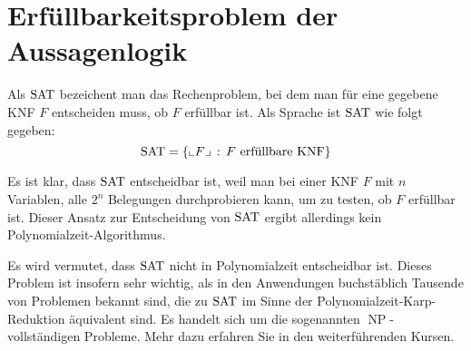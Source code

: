\section{Erfüllbarkeitsproblem der Aussagenlogik}

\begin{defn}
	Als $\operatorname{SAT}$ bezeichent man das Rechenproblem, bei dem man für eine gegebene KNF $F$ entscheiden muss, ob $F$ erfüllbar ist. Als Sprache ist $\operatorname{SAT}$ wie folgt gegeben: 
	\[
		\operatorname{SAT} = \left\{ {\llcorner F\lrcorner} \,:\, F \ \text{erfüllbare KNF} \right\}
	\]
\end{defn} 

\begin{bem}
	Es ist klar, dass $\operatorname{SAT}$ entscheidbar ist, weil man bei einer KNF $F$ mit $n$ Variablen, alle $2^n$ Belegungen durchprobieren kann, um zu testen, ob $F$ erfüllbar ist. Dieser Ansatz zur Entscheidung von $\operatorname{SAT}$ ergibt allerdings kein Polynomialzeit-Algorithmus. 
\end{bem} 

\begin{bem} 
	Es wird vermutet, dass $\operatorname{SAT}$  nicht in Polynomialzeit entscheidbar ist. Dieses Problem ist insofern sehr wichtig, als in den Anwendungen buchstäblich Tausende von Problemen bekannt sind, die zu $\operatorname{SAT}$ im Sinne der Polynomialzeit-Karp-Reduktion äquivalent sind. Es handelt sich um die sogenannten $\operatorname{NP}$-vollständigen Probleme. Mehr dazu erfahren Sie in den weiterführenden Kursen. 
\end{bem} 

